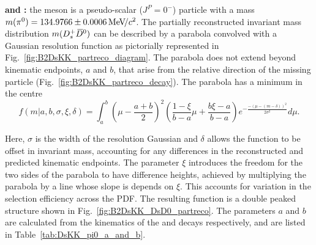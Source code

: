 \begin{description}
\item \textbf{\decay{\Bp}{(\decay{\Dssp}{\Dsp[\piz]})\Dzb} and \decay{\Bp}{\Dsp(\decay{\Dstarzb}{\Dzb[\piz]})}:} the \piz meson is a pseudo-scalar ($J^{P} = 0^{-}$) particle with a mass $m({{\pi}^0}) = 134.9766 \pm 0.0006 {\mathrm{\,Me\kern -0.1em V\!/}c^2}$. The partially reconstructed invariant mass distribution $m({{D}^+_{s}}{{\kern 0.2em\overline{\kern -0.2em D}{}}{}^0})$ can be described by a parabola convolved with a Gaussian resolution function as pictorially represented in Fig.~\ref{fig:B2DsKK_partreco_diagram}. The parabola does not extend beyond kinematic endpoints, $a$ and $b$, that arise from the relative direction of the missing particle (Fig.~\ref{fig:B2DsKK_partreco_decay}). The parabola has a minimum in the centre 
\begin{equation}
f(m|a,b,\sigma,\xi, \delta) = \int_{a}^{b}\left(\mu-\frac{a+b}{2}\right)^{2} \left( \frac{1-\xi}{b-a}\mu + \frac{b\xi-a}{b-a} \right) e^{-\frac{-(\mu-(m-\delta))^{2}}{2\sigma^{2}}} d\mu.
\label{eq:DsPhi_RooHorns}
\end{equation} 

Here, $\sigma$ is the width of the resolution Gaussian and $\delta$ allows the function to be offset in invariant mass, accounting for any differences in the reconstructed and predicted kinematic endpoints. The parameter $\xi$ introduces the freedom for the two sides of the parabola to have difference heights, achieved by multiplying the parabola by a line whose slope is depends on $\xi$. This accounts for variation in the selection efficiency across the PDF. The resulting function is a double peaked structure shown in Fig.~\ref{fig:B2DsKK_DsD0_partreco}.   
The parameters $a$ and $b$ are calculated from the kinematics of the \decay{\Bp}{(\decay{\Dssp}{\Dsp\piz})\Dzb} and \decay{\Bp}{\Dsp(\decay{\Dstarzb}{\Dzb\piz})} decays respectively, and are listed in Table~\ref{tab:DsKK_pi0_a_and_b}.

\end{description}



